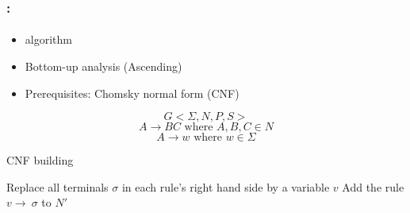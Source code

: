\documentclass[xcolor=table]{beamer}
\begin{document}
\begin{frame}
	\frametitle{\insertshortsubtitle: \insertsection}
	\framesubtitle{\insertsubsection}

	\begin{itemize}
		\item {} algorithm
		\item Bottom-up analysis (Ascending)
		\item Prerequisites: Chomsky normal form (CNF)
	\end{itemize}
	
	\begin{minipage}{.4\textwidth}
		\begin{definition}[CNF]
			\[G <\Sigma, N, P, S>\]
			\[A \rightarrow  B C \text{ where } A, B, C \in N\]
			\[A \rightarrow w \text{ where } w \in \Sigma\]
		\end{definition}
	\end{minipage}
	\begin{minipage}{.56\textwidth}
		\begin{block}{CNF building}
		\tiny
		\begin{algorithm}[H]
			
			Replace all terminals $\sigma$ in each rule's right hand side by a variable $v$\;
			Add the rule $v \rightarrow\ \sigma$ to $N'$\;
		\end{algorithm}
		\end{block}
	\end{minipage}

\end{frame}
\end{document}
